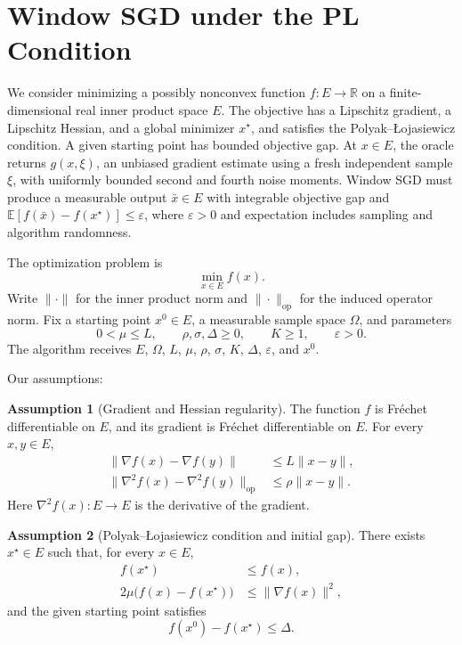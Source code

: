 \documentclass[10pt]{article}
\theoremstyle{definition}
\newtheorem{assumption}{Assumption}
\begin{document}
\section*{Window SGD under the PL Condition}
We consider minimizing a possibly nonconvex function $f:E\to\mathbb{R}$ on a finite-dimensional real inner product space $E$. The objective has a Lipschitz gradient, a Lipschitz Hessian, and a global minimizer $x^\star$, and satisfies the Polyak--\L{}ojasiewicz condition. A given starting point has bounded objective gap. At $x\in E$, the oracle returns $g(x,\xi)$, an unbiased gradient estimate using a fresh independent sample $\xi$, with uniformly bounded second and fourth noise moments. Window SGD must produce a measurable output $\bar{x}\in E$ with integrable objective gap and $\mathbb{E}[f(\bar{x})-f(x^\star)]\leq\varepsilon$, where $\varepsilon>0$ and expectation includes sampling and algorithm randomness.

The optimization problem is
\[
\min_{x\in E} f(x).
\]
Write $\|\cdot\|$ for the inner product norm and $\|\cdot\|_{\mathrm{op}}$ for the induced operator norm. Fix a starting point $x^0\in E$, a measurable sample space $\Omega$, and parameters
\[
0<\mu\leq L,\qquad \rho,\sigma,\Delta\geq0,\qquad K\geq1,\qquad \varepsilon>0.
\]
The algorithm receives $E$, $\Omega$, $L$, $\mu$, $\rho$, $\sigma$, $K$, $\Delta$, $\varepsilon$, and $x^0$.

Our assumptions:
\begin{assumption}[Gradient and Hessian regularity]
The function $f$ is Fr\'echet differentiable on $E$, and its gradient is Fr\'echet differentiable on $E$. For every $x,y\in E$,
\[
\begin{aligned}
\|\nabla f(x)-\nabla f(y)\|&\leq L\|x-y\|,\\
\|\nabla^2 f(x)-\nabla^2 f(y)\|_{\mathrm{op}}&\leq\rho\|x-y\|.
\end{aligned}
\]
Here $\nabla^2 f(x):E\to E$ is the derivative of the gradient.
\end{assumption}

\begin{assumption}[Polyak--\L{}ojasiewicz condition and initial gap]
There exists $x^\star\in E$ such that, for every $x\in E$,
\[
\begin{aligned}
f(x^\star)&\leq f(x),\\
2\mu\bigl(f(x)-f(x^\star)\bigr)&\leq\|\nabla f(x)\|^2,
\end{aligned}
\]
and the given starting point satisfies
\[
f(x^0)-f(x^\star)\leq\Delta.
\]
\end{assumption}
\end{document}
